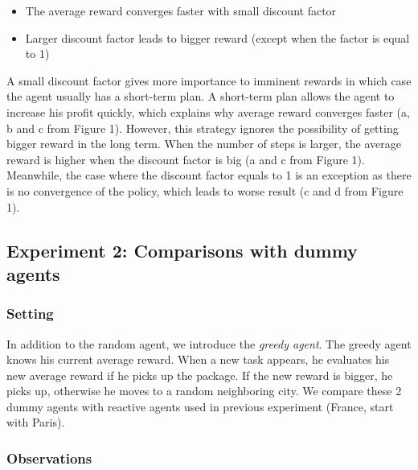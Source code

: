 \documentclass[11pt]{article}
\begin{document}
\begin{itemize}
	\item The average reward converges faster with small discount factor
	\item Larger discount factor leads to bigger reward (except when the factor is equal to 1)
\end{itemize}

A small discount factor gives more importance to imminent rewards in which case the agent usually has a short-term plan. A short-term plan allows the agent to increase his profit quickly, which explains why average reward converges faster (a, b and c from Figure 1). However, this strategy ignores the possibility of getting bigger reward in the long term. When the number of steps is larger, the average reward is higher when the discount factor is big (a and c from Figure 1). Meanwhile, the case where the discount factor equals to 1 is an exception as there is no convergence of the policy, which leads to worse result (c and d from Figure 1). 

\subsection{Experiment 2: Comparisons with dummy agents}

\subsubsection{Setting}

In addition to the random agent, we introduce the \textit{greedy agent}. The greedy agent knows his current average reward. When a new task appears, he evaluates his new average reward if he picks up the package. If the new reward is bigger, he picks up, otherwise he moves to a random neighboring city. We compare these 2 dummy agents with reactive agents used in previous experiment (France, start with Paris).

\subsubsection{Observations}
\end{document}
